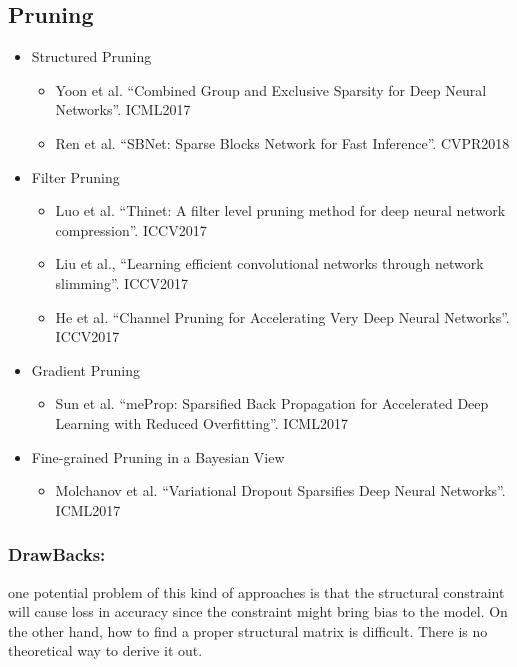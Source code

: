 \documentclass[a4paper]{article}
\begin{document}
		\subsection{Pruning}	
			\begin{itemize}
				\item Structured Pruning
					\begin{itemize}
						\item Yoon et al. “Combined Group and Exclusive Sparsity for Deep Neural Networks”. ICML2017
						\item Ren et al. “SBNet: Sparse Blocks Network for Fast Inference”. CVPR2018
					\end{itemize}
				\item Filter Pruning
					\begin{itemize}
						\item Luo et al. “Thinet: A filter level pruning method for deep neural network compression”.
						ICCV2017
						\item Liu et al., “Learning efficient convolutional networks through network slimming”. ICCV2017
						\item He et al. “Channel Pruning for Accelerating Very Deep Neural Networks”. ICCV2017
					\end{itemize}
				\item Gradient Pruning
					\begin{itemize}
						\item Sun et al. “meProp: Sparsified Back Propagation for Accelerated Deep Learning with
						Reduced Overfitting”. ICML2017
					\end{itemize}
				\item Fine-grained Pruning in a Bayesian View
					\begin{itemize}
						\item Molchanov et al. “Variational Dropout Sparsifies Deep Neural Networks”. ICML2017
					\end{itemize}
			\end{itemize}
			\subsubsection{DrawBacks:}
						one potential problem of this kind of approaches
				is that the structural constraint will cause loss in
				accuracy since the constraint might bring bias to the model.
				On the other hand, how to find a proper structural matrix is
				difficult. There is no theoretical way to derive it out.
\end{document}
